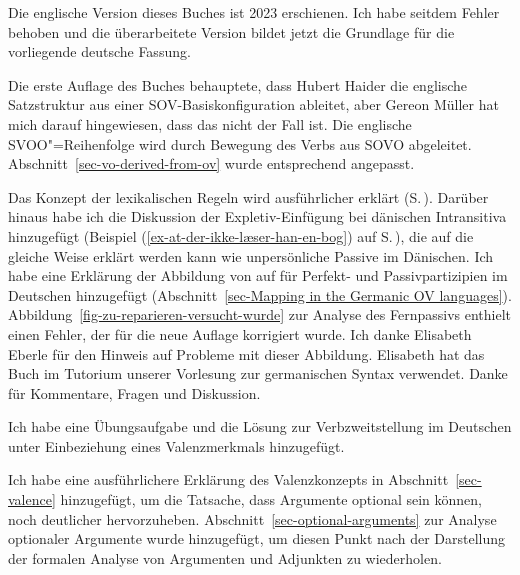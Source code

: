 
Die englische Version dieses Buches ist 2023 erschienen. Ich habe seitdem Fehler behoben und die
überarbeitete Version bildet jetzt die Grundlage für die vorliegende deutsche Fassung.

Die erste Auflage des Buches behauptete, dass Hubert Haider die englische Satzstruktur aus einer
SOV-Basiskonfiguration ableitet, aber Gereon Müller hat mich darauf hingewiesen, dass das nicht der
Fall ist. Die englische SVOO"=Reihenfolge wird durch Bewegung des Verbs aus SOVO
abgeleitet. Abschnitt~\ref{sec-vo-derived-from-ov} wurde entsprechend angepasst. 


Das Konzept der lexikalischen Regeln wird ausführlicher erklärt
(S.\,\pageref{page-lexical-rule-explanation-start}). %
Darüber hinaus habe ich die Diskussion der Expletiv-Einfügung bei dänischen Intransitiva hinzugefügt
(Beispiel (\ref{ex-at-der-ikke-læser-han-en-bog}) auf S.\,\pageref{ex-at-der-ikke-læser-han-en-bog}),
die auf die gleiche Weise erklärt werden kann wie unpersönliche Passive im Dänischen. Ich habe eine
Erklärung der Abbildung von \argst auf \comps für Perfekt- und Passivpartizipien im Deutschen
hinzugefügt (Abschnitt~\ref{sec-Mapping in the Germanic OV
  languages}). Abbildung~\ref{fig-zu-reparieren-versucht-wurde} zur Analyse des Fernpassivs enthielt
einen Fehler, der für die neue Auf\/lage korrigiert wurde. Ich danke Elisabeth Eberle für den Hinweis
auf Probleme mit dieser Abbildung. Elisabeth hat das Buch im Tutorium unserer Vorlesung zur
germanischen Syntax verwendet. Danke für Kommentare, Fragen und Diskussion. 


Ich habe eine Übungsaufgabe und die Lösung zur Verbzweitstellung im Deutschen unter Einbeziehung eines Valenzmerkmals hinzugefügt.






Ich habe eine ausführlichere Erklärung des Valenzkonzepts in Abschnitt~\ref{sec-valence} hinzugefügt, um die Tatsache, dass Argumente
optional sein können, noch deutlicher hervorzuheben. Abschnitt~\ref{sec-optional-arguments} zur
Analyse optionaler Argumente wurde hinzugefügt, um diesen Punkt nach der Darstellung der formalen
Analyse von Argumenten und Adjunkten zu wiederholen.


